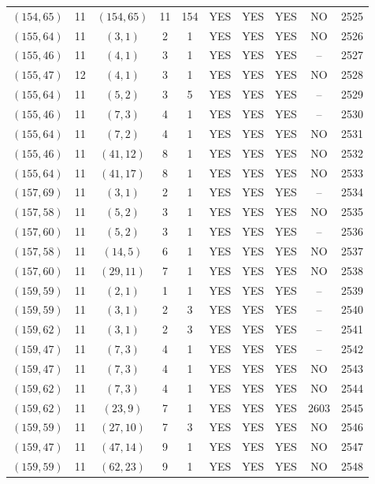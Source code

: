 \begin{longtable}{|c|c|c|c|c|c|c|c|c|c|}
$(154, 65)$ & 11 & $(154, 65)$ & 11 & 154 & YES & YES & YES & NO & 2525\\
$(155, 64)$ & 11 & $(3, 1)$ & 2 & 1 & YES & YES & YES & NO & 2526\\
$(155, 46)$ & 11 & $(4, 1)$ & 3 & 1 & YES & YES & YES & -- & 2527\\
$(155, 47)$ & 12 & $(4, 1)$ & 3 & 1 & YES & YES & YES & NO & 2528\\
$(155, 64)$ & 11 & $(5, 2)$ & 3 & 5 & YES & YES & YES & -- & 2529\\
$(155, 46)$ & 11 & $(7, 3)$ & 4 & 1 & YES & YES & YES & -- & 2530\\
$(155, 64)$ & 11 & $(7, 2)$ & 4 & 1 & YES & YES & YES & NO & 2531\\
$(155, 46)$ & 11 & $(41, 12)$ & 8 & 1 & YES & YES & YES & NO & 2532\\
$(155, 64)$ & 11 & $(41, 17)$ & 8 & 1 & YES & YES & YES & NO & 2533\\
$(157, 69)$ & 11 & $(3, 1)$ & 2 & 1 & YES & YES & YES & -- & 2534\\
$(157, 58)$ & 11 & $(5, 2)$ & 3 & 1 & YES & YES & YES & NO & 2535\\
$(157, 60)$ & 11 & $(5, 2)$ & 3 & 1 & YES & YES & YES & -- & 2536\\
$(157, 58)$ & 11 & $(14, 5)$ & 6 & 1 & YES & YES & YES & NO & 2537\\
$(157, 60)$ & 11 & $(29, 11)$ & 7 & 1 & YES & YES & YES & NO & 2538\\
$(159, 59)$ & 11 & $(2, 1)$ & 1 & 1 & YES & YES & YES & -- & 2539\\
$(159, 59)$ & 11 & $(3, 1)$ & 2 & 3 & YES & YES & YES & -- & 2540\\
$(159, 62)$ & 11 & $(3, 1)$ & 2 & 3 & YES & YES & YES & -- & 2541\\
$(159, 47)$ & 11 & $(7, 3)$ & 4 & 1 & YES & YES & YES & -- & 2542\\
$(159, 47)$ & 11 & $(7, 3)$ & 4 & 1 & YES & YES & YES & NO & 2543\\
$(159, 62)$ & 11 & $(7, 3)$ & 4 & 1 & YES & YES & YES & NO & 2544\\
$(159, 62)$ & 11 & $(23, 9)$ & 7 & 1 & YES & YES & YES & 2603 & 2545\\
$(159, 59)$ & 11 & $(27, 10)$ & 7 & 3 & YES & YES & YES & NO & 2546\\
$(159, 47)$ & 11 & $(47, 14)$ & 9 & 1 & YES & YES & YES & NO & 2547\\
$(159, 59)$ & 11 & $(62, 23)$ & 9 & 1 & YES & YES & YES & NO & 2548\\

\end{longtable}
